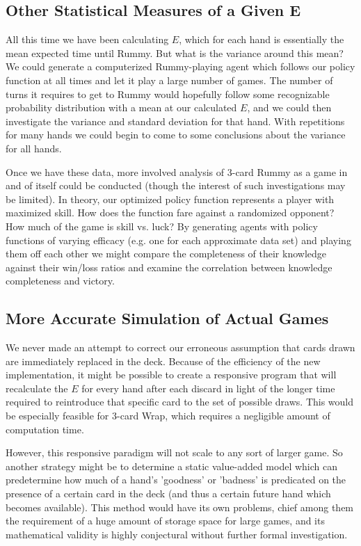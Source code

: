 \documentclass[letter,12pt]{article}
\begin{document}
\subsection{Other Statistical Measures of a Given E}

All this time we have been calculating $E$, which for each hand is essentially the mean expected time until Rummy. But what is the variance around this mean? We could generate a computerized Rummy-playing agent which follows our policy function at all times and let it play a large number of games. The number of turns it requires to get to Rummy would hopefully follow some recognizable probability distribution with a mean at our calculated $E$, and we could then investigate the variance and standard deviation for that hand. With repetitions for many hands we could begin to come to some conclusions about the variance for all hands.

Once we have these data, more involved analysis of 3-card Rummy as a game in and of itself could be conducted (though the interest of such investigations may be limited). In theory, our optimized policy function represents a player with maximized skill. How does the function fare against a randomized opponent?   How much of the game is skill vs. luck? By generating agents with policy functions of varying efficacy (e.g. one for each approximate data set) and playing them off each other we might compare the completeness of their knowledge against their win/loss ratios and examine the correlation between knowledge completeness and victory.

\subsection{More Accurate Simulation of Actual Games}

We never made an attempt to correct our erroneous assumption that cards drawn are immediately replaced in the deck. Because of the efficiency of the new implementation, it might be possible to create a responsive program that will recalculate the $E$ for every hand after each discard in light of the longer time required to reintroduce that specific card to the set of possible draws. This would be especially feasible for 3-card Wrap, which requires a negligible amount of computation time.

However, this responsive paradigm will not scale to any sort of larger game. So another strategy might be to determine a static value-added model which can predetermine how much of a hand's 'goodness' or 'badness' is predicated on the presence of a certain card in the deck (and thus a certain future hand which becomes available). This method would have its own problems, chief among them the requirement of a huge amount of storage space for large games, and its mathematical validity is highly conjectural without further formal investigation.
\end{document}
